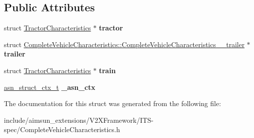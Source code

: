 \subsection*{Public Attributes}
\begin{DoxyCompactItemize}
\item 
struct \hyperlink{structTractorCharacteristics}{Tractor\+Characteristics} $\ast$ {\bfseries tractor}\hypertarget{structCompleteVehicleCharacteristics_a2afb2396dca896b7ae4bb20d297b6ff2}{}\label{structCompleteVehicleCharacteristics_a2afb2396dca896b7ae4bb20d297b6ff2}

\item 
struct \hyperlink{structCompleteVehicleCharacteristics_1_1CompleteVehicleCharacteristics____trailer}{Complete\+Vehicle\+Characteristics\+::\+Complete\+Vehicle\+Characteristics\+\_\+\+\_\+trailer} $\ast$ {\bfseries trailer}\hypertarget{structCompleteVehicleCharacteristics_a4accd4f1a14af8ff5f8a2f622e08077b}{}\label{structCompleteVehicleCharacteristics_a4accd4f1a14af8ff5f8a2f622e08077b}

\item 
struct \hyperlink{structTractorCharacteristics}{Tractor\+Characteristics} $\ast$ {\bfseries train}\hypertarget{structCompleteVehicleCharacteristics_a96267d7fbf5b2feecdff6b445fdfea0f}{}\label{structCompleteVehicleCharacteristics_a96267d7fbf5b2feecdff6b445fdfea0f}

\item 
\hyperlink{structasn__struct__ctx__s}{asn\+\_\+struct\+\_\+ctx\+\_\+t} {\bfseries \+\_\+asn\+\_\+ctx}\hypertarget{structCompleteVehicleCharacteristics_a248ecf2ddd9ea344175524f21f62954d}{}\label{structCompleteVehicleCharacteristics_a248ecf2ddd9ea344175524f21f62954d}

\end{DoxyCompactItemize}


The documentation for this struct was generated from the following file\+:\begin{DoxyCompactItemize}
\item 
include/aimsun\+\_\+extensions/\+V2\+X\+Framework/\+I\+T\+S-\/spec/Complete\+Vehicle\+Characteristics.\+h\end{DoxyCompactItemize}
